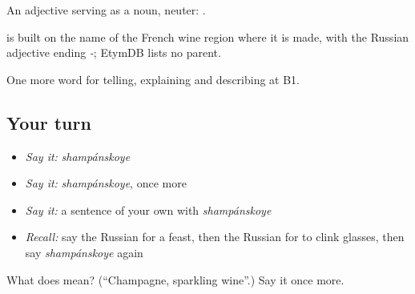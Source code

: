 An adjective serving as a noun, neuter: \emph{ }.

\begin{cousinweb}
\emph{} is built on the name of the French wine region where it is made, with the Russian adjective ending \emph{-}; EtymDB lists no parent.
\end{cousinweb}

\begin{grammarlens}[title={What you've built}]
One more word for telling, explaining and describing at B1.
\end{grammarlens}

\subsection*{Your turn}
\begin{itemize}
\raggedright
  \item \emph{Say it:} \emph{shampánskoye}
  \item \emph{Say it:} \emph{shampánskoye}, once more
  \item \emph{Say it:} a sentence of your own with \emph{shampánskoye}
  \item \emph{Recall:} say the Russian for a feast, then the Russian for to clink glasses, then say \emph{shampánskoye} again
\end{itemize}

\begin{tcolorbox}[breakable,colback=teal!4,colframe=teal!35!black,title={Before you move on}]
What does  mean? (\textquotedblleft{}Champagne, sparkling wine\textquotedblright{}.) Say it once more.
\end{tcolorbox}
